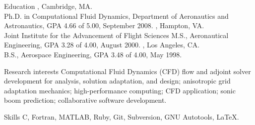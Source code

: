 \documentclass{resume}
\author{~~~~~~Michael Andrew Park}
\begin{document}
\maketitle


\begin{category}{Education}
, Cambridge, MA.\\
Ph.D. in Computational Fluid Dynamics, Department of Aeronautics and Astronautics,  GPA 4.66 of 5.00, September 2008.
, Hampton, VA.\\
Joint Institute for the Advancement of Flight Sciences
M.S., Aeronautical Engineering, GPA 3.28 of 4.00, August 2000.
, Los Angeles, CA.\\
B.S., Aerospace Engineering, GPA 3.48 of 4.00, May 1998.
\end{category}


\begin{category}{Research interests}
\citemnobullet 
Computational Fluid Dynamics (CFD) flow and adjoint
solver development for analysis, solution adaptation, and design;
anisotropic grid adaptation mechanics;
high-performance computing;
CFD application;
sonic boom prediction;
collaborative software development.
\end{category}

\begin{category}{Skills}
\citemnobullet 
C, Fortran, MATLAB, Ruby, Git, Subversion, GNU Autotools, \LaTeX.
\end{category}
\end{document}
